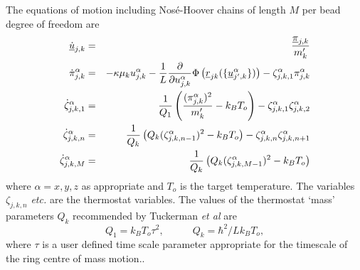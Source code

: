 The equations of motion including Nos\'{e}-Hoover chains of length $M$
per bead degree of freedom \cite{tuckerman-93a} are
\begin{eqnarray}
  \mbox{$\underline{\dot{u}}$}_{j,k}&=&\frac{\mbox{$\underline{\pi}$}_{j,k}}{m_{k}'} \nonumber \\
  {\dot \pi}_{j,k}^{\alpha}&=&-\kappa \mu_{k}u_{j,k}^{\alpha}-\frac{1}{L} \frac{\partial}
  {\partial u_{j,k}^{\alpha}}\Phi\left (\mbox{$\underline{r}$}_{jk}(\{\mbox{$\underline{u}$}_{j',k}^{\alpha}\})\right )-
  \zeta_{j,k,1}^{\alpha}{\pi}_{j,k}^{\alpha} \nonumber \\
  {\dot \zeta}_{j,k,1}^{\alpha}&=&\frac{1}{Q_{1}} \left (\frac{(\pi_{j,k}^{\alpha})^{2}}{m_{k}'}-k_{B}T_{o} \right )
  -\zeta_{j,k,1}^{\alpha}\zeta_{j,k,2}^{\alpha} \label{pimd-nhc}\\
  {\dot \zeta}_{j,k,n}^{\alpha}&=&\frac{1}{Q_{k}} \left (Q_{k}(\zeta_{j,k,n-1}^{\alpha})^{2}-k_{B}T_{o} \right )
  -\zeta_{j,k,n}^{\alpha}\zeta_{j,k,n+1}^{\alpha}  \nonumber\\
  {\dot \zeta}_{j,k,M}^{\alpha}&=&\frac{1}{Q_{k}} \left (Q_{k}(\zeta_{j,k,M-1}^{\alpha})^{2}-k_{B}T_{o} \right ) \nonumber
\end{eqnarray}
where $\alpha=x,y,z$ as appropriate and $T_{o}$ is the target
temperature.  The variables $\zeta_{j,k,n}$ {\em etc.} are the
thermostat variables. The values of the thermostat `mass' parameters
$Q_{k}$ recommended by Tuckerman {\em et al} \cite{tuckerman-93a} are
\begin{equation}
  Q_{1}=k_{B}T_{o} \tau^{2}, \phantom{xxxxx} Q_{k}=\hbar^{2}/Lk_{B}T_{o},
\end{equation}
where $\tau$ is a user defined time scale parameter appropriate for
the timescale of the ring centre of mass motion..


